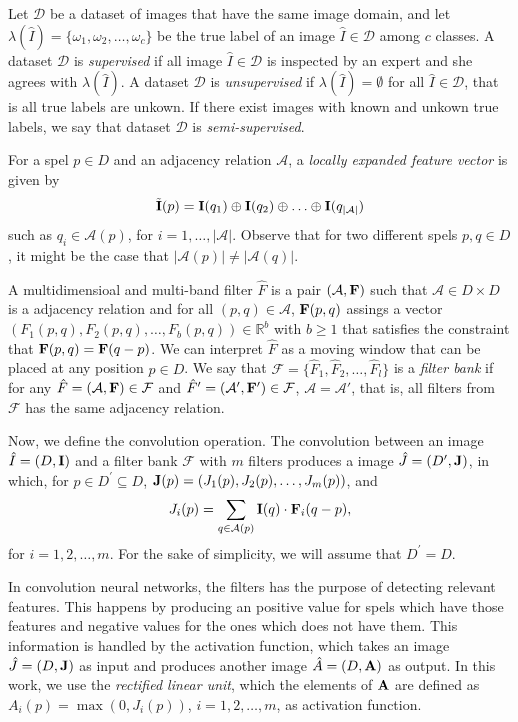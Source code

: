 \documentclass[10pt,twocolumn,letterpaper]{article}
\newcommand{\R}{\mathbb{R}}
\newcommand{\A}{\mathcal{A}}
\newcommand{\D}{\mathcal{D}}
\newcommand{\I}{\hat{I}}
\newcommand{\m}[1]{{\mathrm{\bf #1}}}
\newcommand{\E}{\tilde{\m{I}}}
\newcommand{\F}{\hat{F}}
\newcommand{\lI}{\m{I}}
\newcommand{\mF}{\m{F}}
\newcommand{\bF}{\mathcal{F}}
\newcommand{\J}{\hat{J}}
\newcommand{\lJ}{\m{J}}
\newcommand{\pD}{D^\prime}
\begin{document}
Let $\D$ be a dataset of images that have the same image domain, and let $\lambda(\I) = \{\omega_1, \omega_2, \ldots, \omega_c\}$ be the true label of an image $\I \in \D$ among $c$ classes. A dataset $\D$ is \textit{supervised} if all image $\I \in \D$ is inspected by an expert and she agrees with $\lambda(\I)$. A dataset $\D$ is \textit{unsupervised} if $\lambda(\I) = \emptyset$ for all $\I \in \D$, that is all true labels are unkown. If there exist images with known and unkown true labels, we say that dataset $\D$ is \textit{semi-supervised}.

For a spel $p \in D$ and an adjacency relation $\A$, a \textit{locally expanded feature vector} is given by \[\E(p) = \lI(q_1) \oplus \lI(q_2) \oplus \ldots \oplus \lI(q_{|\A|})\] such as $q_i \in \A(p)$, for $i = 1, \ldots, |\A|$. Observe that for two different spels $p, q \in D$, it might be the case that $|\A(p)| \neq |\A(q)|$.


A multidimensioal and multi-band filter $\F$ is a pair $(\A, \mF)$ such that $\A \in D \times D$ is a adjacency relation and for all $(p, q) \in \A$, $\mF(p, q)$ assings a vector $(F_1(p, q), F_2(p, q), \ldots, F_b(p, q)) \in \R^b$ with $b \ge 1$ that satisfies the constraint that $\mF(p, q) = \mF(q - p)$. We can interpret $\F$ as a moving window that can be placed at any position $p \in D$. We say that $\bF = \{\F_1, \F_2, \ldots, \F_l\}$ is a \textit{filter bank} if for any $\F = (\A, \mF) \in \bF$ and $\F' = (\A', \mF') \in \bF$, $\A = \A'$, that is, all filters from $\bF$ has the same adjacency relation.

Now, we define the convolution operation. The convolution between an image $\I = (D, \lI)$ and a filter bank $\bF$ with $m$ filters produces a image $\J = (\pD, \lJ)$, in which, for $p \in \pD\subseteq D$, $\lJ(p) = (J_1(p), J_2(p), \ldots, J_m(p))$, and \[J_i(p) = \sum_{q \in \A(p)}\lI(q) \cdot {{\bf F}_i(q - p)},\] for $i = 1, 2,  \ldots, m$. For the sake of simplicity, we will assume that $\pD=D$. 

In convolution neural networks, the filters has the purpose of detecting relevant features. This happens by producing an positive value for spels which have those features and negative values for the ones which does not have them. This information is handled by the activation function, which takes an image $\J = (D, \lJ)$ as input and produces another image $\hat{A} = (D, \m{A})$ as output.  In this work, we use the \textit{rectified linear unit}, which the elements of $\m{A}$ are defined as $A_i(p) = \max(0, J_i(p))$, $i=1,2,\ldots,m$, as activation function.
\end{document}
